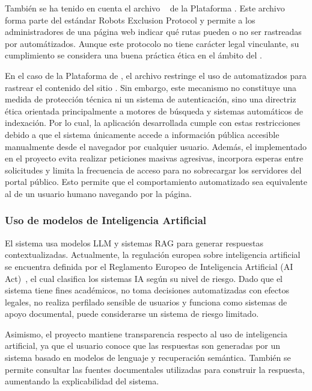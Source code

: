 También se ha tenido en cuenta el archivo ~\cite{legal:robots} de la Plataforma \contsec{}. Este archivo forma parte del estándar Robots Exclusion Protocol y permite a los administradores de una página web indicar qué rutas pueden o no ser rastreadas por  automátizados. Aunque este protocolo no tiene carácter legal vinculante, su cumplimiento se considera una buena práctica ética en el ámbito del .

En el caso de la Plataforma de \contsec{}, el archivo  restringe el uso de  automatizados para rastrear el contenido del sitio . Sin embargo, este mecanismo no constituye una medida de protección técnica ni un sistema de autenticación, sino una directriz ética orientada principalmente a motores de búsqueda y sistemas automáticos de indexación. Por lo cual, la aplicación desarrollada cumple con estas restricciones debido a que el sistema únicamente accede a información pública accesible manualmente desde el navegador por cualquier usuario. Además, el  implementado en el proyecto evita realizar peticiones masivas agresivas, incorpora esperas entre solicitudes y limita la frecuencia de acceso para no sobrecargar los servidores del portal público. Esto permite que el comportamiento automatizado sea equivalente al de un usuario humano navegando por la página.

\subsubsection{Uso de modelos de Inteligencia Artificial}\label{subsec:IA}

El sistema usa modelos LLM y sistemas RAG para generar respuestas contextualizadas. Actualmente, la regulación europea sobre inteligencia artificial se encuentra definida por el Reglamento Europeo de Inteligencia Artificial (AI Act)~\cite{legal:IA}, el cual clasifica los sistemas IA según su nivel de riesgo. Dado que el sistema tiene fines académicos, no toma decisiones automatizadas con efectos legales, no realiza perfilado sensible de usuarios y funciona como sistemas de apoyo documental, puede considerarse un sistema de riesgo limitado. 

Asimismo, el proyecto mantiene transparencia respecto al uso de inteligencia artificial, ya que el usuario conoce que las respuestas son generadas por un sistema basado en modelos de lenguaje y recuperación semántica. También se permite consultar las fuentes documentales utilizadas para construir la respuesta, aumentando la explicabilidad del sistema.

